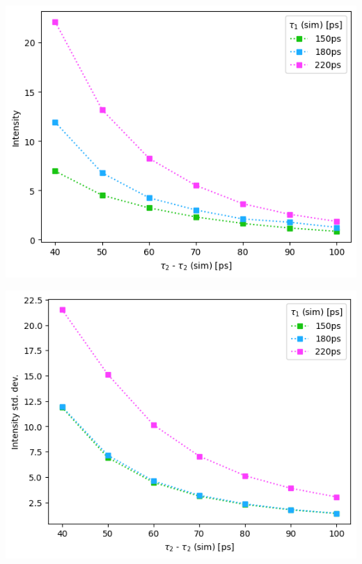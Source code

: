 {\begin{minipage}{.47\linewidth}
    \includegraphics[width=\linewidth]{Batch 3/regular IRF/5050-diff i1.png}
    \label{fig:comp-I-5050}
\end{minipage}
\hfill
\begin{minipage}{.47\linewidth}
    \includegraphics[width=\linewidth]{Batch 3/regular IRF/5050-err i1.png}
    \label{fig:comp-Ierr-5050}
\end{minipage}
\begin{minipage}{.47\linewidth}

\end{minipage}}
